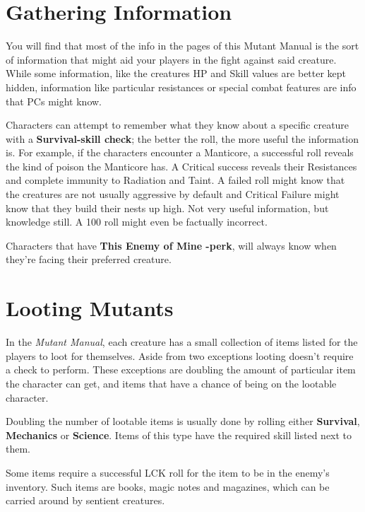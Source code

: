 \documentclass[11pt,a4paper,twocolumn]{book}
\begin{document}
	\vfill
	
	\section{Gathering Information}
	You will find that most of the info in the pages of this Mutant Manual is the sort of information that might aid your players in the fight against said creature. While some information, like the creatures HP and Skill values are better kept hidden, information like particular resistances or special combat features are info that PCs might know.
	
	\smallskip
	
	Characters can attempt to remember what they know about a specific creature with a \textbf{Survival-skill check}; the better the roll, the more useful the information is. For example, if the characters encounter a Manticore, a successful roll reveals the kind of poison the Manticore has. A Critical success reveals their Resistances and complete immunity to Radiation and Taint. A failed roll might know that the creatures are not usually aggressive by default and Critical Failure might know that they build their nests up high. Not very useful information, but knowledge still. A 100 roll might even be factually incorrect.
	
	Characters that have \textbf{This Enemy of Mine -perk}, will always know when they're facing their preferred creature.
	
	\section*{Looting Mutants}
	In the \emph{Mutant Manual}, each creature has a small collection of items listed for the players to loot for themselves. Aside from two exceptions looting doesn't require a check to perform. These exceptions are doubling the amount of particular item the character can get, and items that have a chance of being on the lootable character.
	
	Doubling the number of lootable items is usually done by rolling either \textbf{Survival}, \textbf{Mechanics} or \textbf{Science}. Items of this type have the required skill listed next to them. 
	
	Some items require a successful LCK roll for the item to be in the enemy's inventory. Such items are books, magic notes and magazines, which can be carried around by sentient creatures.
	
\end{document}
